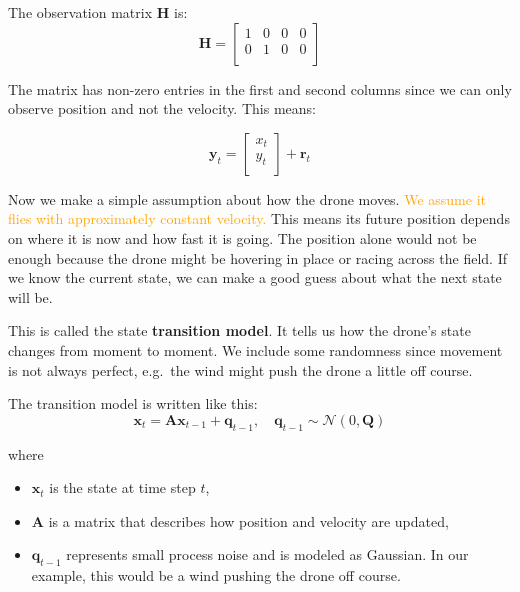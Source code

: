 \begin{example}
The observation matrix \textbf{H} is: 
\[\mathbf{H} = \begin{bmatrix}
   1 & 0 & 0 & 0\\
   0 & 1 & 0 & 0\\   
\end{bmatrix}\]

The matrix has non-zero entries in the first and second columns since we can only observe position and not the velocity. This means: 

\[\mathbf{y}_t = \begin{bmatrix}
   x_t \\
   y_t \\ 
\end{bmatrix} + \textbf{r}_t\]


\medskip 
Now we make a simple assumption about how the drone moves. %
\textcolor{orange}{We assume it flies with approximately constant velocity.} This means its future position depends on where it is now and how fast it is going. The position alone would not be enough because the drone might be hovering in place or racing across the field. If we know the current state, we can make a good guess about what the next state will be. 

This is called the state \textbf{transition model}. It tells us how the drone's state changes from moment to moment. We include some randomness since movement is not always perfect, e.g.~the wind might push the drone a little off course. 

The transition model is written like this: 
\begin{equation}\label{eq: transition model}
\mathbf{x}_t = \mathbf{A}\mathbf{x}_{t-1}+\mathbf{q}_{t-1}, \quad \mathbf{q}_{t-1} \sim \mathcal{N}(0, \mathbf{Q})  
\end{equation}

where 
\begin{itemize}
    \item $\mathbf{x}_t$ is the state at time step $t$,
    \item $\mathbf{A}$ is a matrix that describes how position and velocity are updated, 
    \item $\mathbf{q}_{t-1}$ represents small process noise and is modeled as Gaussian. In our example, this would be a wind pushing the drone off course. 
\end{itemize}


\end{example}
